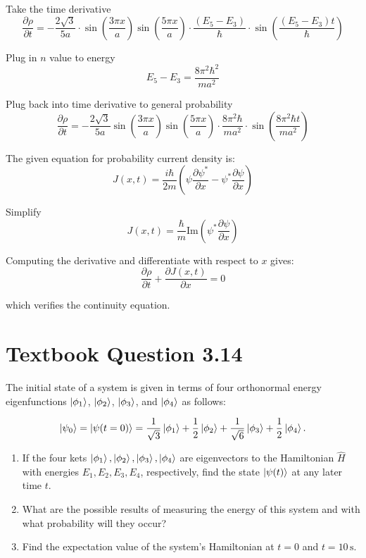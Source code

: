 \documentclass[12pt]{article}
\begin{document}
        Take the time derivative
        \[
            \frac{\partial \rho}{\partial t} = -\frac{2\sqrt{3}}{5a} \cdot \sin\left( \frac{3\pi x}{a} \right) \sin\left( \frac{5\pi x}{a} \right) \cdot \frac{(E_5 - E_3)}{\hbar} \cdot \sin\left( \frac{(E_5 - E_3)t}{\hbar} \right)
        \]

        Plug in $n$ value to energy
        \[
            E_5 - E_3 = \frac{8\pi^2 \hbar^2}{ma^2}
        \]

        Plug back into time derivative to general probability
        \[
            \frac{\partial \rho}{\partial t} = -\frac{2\sqrt{3}}{5a} \sin\left( \frac{3\pi x}{a} \right) \sin\left( \frac{5\pi x}{a} \right) \cdot \frac{8\pi^2 \hbar}{ma^2} \cdot \sin\left( \frac{8\pi^2 \hbar t}{ma^2} \right)
        \]

        The given equation for probability current density is:
        \[
            J(x,t) = \frac{i\hbar}{2m} \left( \psi \frac{\partial \psi^*}{\partial x} - \psi^* \frac{\partial \psi}{\partial x} \right)
        \]

        Simplify
        \[
        J(x,t) = \frac{\hbar}{m} \text{Im} \left( \psi^* \frac{\partial \psi}{\partial x} \right)
        \]
        
        Computing the derivative and differentiate with respect to \( x \) gives:
        \[
            \frac{\partial \rho}{\partial t} + \frac{\partial J(x,t)}{\partial x} = 0
        \]

        which verifies the continuity equation.

\section{Textbook Question 3.14}
    The initial state of a system is given in terms of four orthonormal energy eigenfunctions \( \ket{\phi_1} \), \( \ket{\phi_2} \), \( \ket{\phi_3} \), and \( \ket{\phi_4} \) as follows:

    \[
        \ket{\psi_0} = \ket{\psi(t=0)} = \frac{1}{\sqrt{3}}\ket{\phi_1} + \frac{1}{2}\ket{\phi_2} + \frac{1}{\sqrt{6}}\ket{\phi_3} + \frac{1}{2}\ket{\phi_4}.
    \]

    \begin{enumerate}
        \item[(a)] If the four kets \( \ket{\phi_1}, \ket{\phi_2}, \ket{\phi_3}, \ket{\phi_4} \) are eigenvectors to the Hamiltonian \( \hat{H} \) with energies \( E_1, E_2, E_3, E_4 \), respectively, find the state \( \ket{\psi(t)} \) at any later time \( t \).
        
        \item[(b)] What are the possible results of measuring the energy of this system and with what probability will they occur?
        
        \item[(c)] Find the expectation value of the system’s Hamiltonian at \( t = 0 \) and \( t = 10\,\text{s} \).
    \end{enumerate}
    
\end{document}
